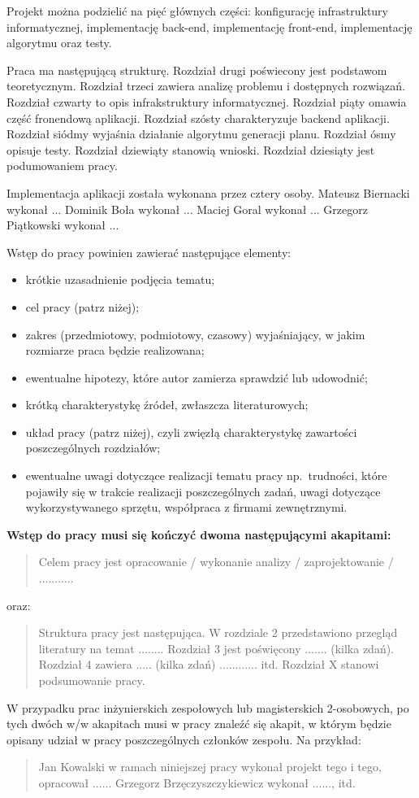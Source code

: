 Projekt można podzielić na pięć głównych części: konfigurację infrastruktury informatycznej, implementację back-end, implementację front-end, implementację algorytmu oraz testy.

Praca ma następującą strukturę. Rozdział drugi poświecony jest podstawom teoretycznym. Rozdział trzeci zawiera analizę problemu i dostępnych rozwiązań. Rozdział czwarty to opis infrakstruktury informatycznej. Rozdział piąty omawia część fronendową aplikacji. Rozdział szósty charakteryzuje backend aplikacji. Rozdział siódmy wyjaśnia działanie algorytmu generacji planu. Rozdział ósmy opisuje testy. Rozdział dziewiąty stanowią wnioski. Rozdział dziesiąty jest podumowaniem pracy. 

Implementacja aplikacji została wykonana przez cztery osoby.
Mateusz Biernacki wykonał ...
Dominik Boła wykonał ...
Maciej Goral wykonał ...
Grzegorz Piątkowski wykonał ...

Wstęp do pracy powinien zawierać następujące elementy:
\begin{itemize}
    \item krótkie uzasadnienie podjęcia tematu; 
    \item cel pracy (patrz niżej); 
    \item zakres (przedmiotowy, podmiotowy, czasowy) wyjaśniający, w jakim rozmiarze praca będzie realizowana; 
    \item ewentualne hipotezy, które autor zamierza sprawdzić lub udowodnić; 
    \item krótką charakterystykę źródeł, zwłaszcza literaturowych; 
    \item układ pracy (patrz niżej), czyli zwięzłą charakterystykę zawartości poszczególnych rozdziałów; 
    \item ewentualne uwagi dotyczące realizacji tematu pracy np.~trudności, które pojawiły się w trakcie 
    realizacji poszczególnych zadań, uwagi dotyczące wykorzystywanego sprzętu, współpraca z firmami zewnętrznymi. 
\end{itemize}

\noindent
\textbf{Wstęp do pracy musi się kończyć dwoma następującymi akapitami:}
\begin{quote}
Celem pracy jest opracowanie / wykonanie analizy / zaprojektowanie / ...........
\end{quote}
oraz:
\begin{quote}
Struktura pracy jest następująca. W rozdziale 2 przedstawiono przegląd literatury na temat ........ 
Rozdział 3 jest poświęcony ....... (kilka zdań). 
Rozdział 4 zawiera ..... (kilka zdań) ............ itd. 
Rozdział X stanowi podsumowanie pracy. 
\end{quote}

W przypadku prac inżynierskich zespołowych lub magisterskich 2-osobowych, po tych dwóch w/w akapitach 
musi w pracy znaleźć się akapit, w którym będzie opisany udział w pracy poszczególnych członków zespołu. Na przykład:

\begin{quote}
Jan Kowalski w ramach niniejszej pracy wykonał projekt tego i tego, opracował ......
Grzegorz Brzęczyszczykiewicz wykonał ......, itd. 
\end{quote}

